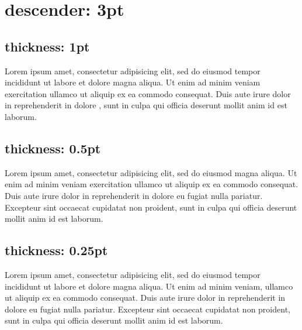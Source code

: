 \documentclass{article}
\begin{document}
\section{descender: 3pt}

\clozedescender{3pt}

\subsection{thickness: 1pt}

\clozelinethickness{1pt}

Lorem ipsum  amet, consectetur adipisicing elit, sed
do eiusmod tempor incididunt ut labore et dolore magna aliqua. Ut enim
ad minim veniam exercitation ullamco  ut aliquip ex
ea commodo consequat. Duis aute irure dolor in reprehenderit in
 dolore , sunt in culpa
qui officia deserunt mollit anim id est laborum.

\subsection{thickness: 0.5pt}

\clozelinethickness{0.5pt}

Lorem ipsum  amet, consectetur adipisicing elit, sed
do eiusmod  magna aliqua.
Ut enim ad minim veniam exercitation ullamco  ut
aliquip ex ea commodo consequat. Duis aute irure dolor in reprehenderit
in  dolore eu fugiat nulla pariatur.
Excepteur sint occaecat cupidatat non proident, sunt in culpa qui
officia deserunt mollit anim id est laborum.

\subsection{thickness: 0.25pt}

\clozelinethickness{0.25pt}

Lorem ipsum  amet, consectetur adipisicing elit, sed
do eiusmod tempor incididunt ut labore et dolore magna aliqua. Ut enim
ad minim veniam, ullamco  ut aliquip
ex ea commodo consequat. Duis aute irure dolor in reprehenderit in
 dolore eu fugiat nulla pariatur.
Excepteur sint occaecat cupidatat non proident, sunt in culpa qui
officia deserunt mollit anim id est laborum.
\end{document}
